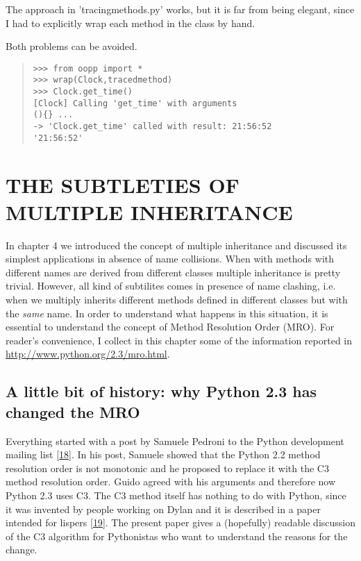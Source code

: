 \documentclass[10pt,english]{article}
\begin{document}
The approach in 'tracingmethods.py' works, but it is far from
being elegant, since I had to explicitly wrap each method in the
class by hand.

Both problems can be avoided.
\begin{quote}
\begin{verbatim}>>> from oopp import *
>>> wrap(Clock,tracedmethod)
>>> Clock.get_time()
[Clock] Calling 'get_time' with arguments
(){} ...
-> 'Clock.get_time' called with result: 21:56:52
'21:56:52'\end{verbatim}
\end{quote}



\hypertarget{the-subtleties-of-multiple-inheritance}{}
\section*{THE SUBTLETIES OF MULTIPLE INHERITANCE}

In chapter 4 we introduced the concept of multiple inheritance and discussed
its simplest applications in absence of name collisions. When with methods
with different names are derived from different classes multiple inheritance
is pretty trivial. However, all kind of subtilites comes in presence of name 
clashing, i.e. when we multiply inherits different methods defined in different
classes but with the \emph{same} name.
In order to understand what happens in this situation, it is essential to 
understand the concept of Method Resolution Order (MRO). For reader's
convenience, I collect in this chapter some of the information
reported in \href{http://www.python.org/2.3/mro.html}{http://www.python.org/2.3/mro.html}.



\hypertarget{a-little-bit-of-history-why-python-2-3-has-changed-the-mro}{}
\subsection*{A little bit of history: why Python 2.3 has changed the MRO}

Everything started with a post by Samuele Pedroni to the Python
development mailing list [\hyperlink{id36}{18}].  In his post, Samuele showed that the
Python 2.2 method resolution order is not monotonic and he proposed to
replace it with the C3 method resolution order.  Guido agreed with his
arguments and therefore now Python 2.3 uses C3.  The C3 method itself
has nothing to do with Python, since it was invented by people working
on Dylan and it is described in a paper intended for lispers [\hyperlink{id40}{19}].  The
present paper gives a (hopefully) readable discussion of the C3
algorithm for Pythonistas who want to understand the reasons for the
change.
\end{document}
